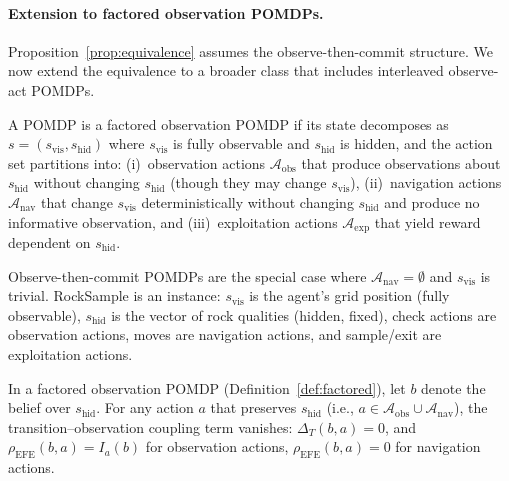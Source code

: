 \documentclass[runningheads]{llncs}
\begin{document}
\paragraph{Extension to factored observation POMDPs.}
\label{par:frontier}
Proposition~\ref{prop:equivalence} assumes the observe-then-commit structure. We now extend the equivalence to a broader class that includes interleaved observe-act POMDPs.

\begin{definition}
\label{def:factored}
A POMDP is a factored observation POMDP if its state decomposes as $s = (s_{\mathrm{vis}}, s_{\mathrm{hid}})$ where $s_{\mathrm{vis}}$ is fully observable and $s_{\mathrm{hid}}$ is hidden, and the action set partitions into: (i)~observation actions $\mathcal{A}_{\mathrm{obs}}$ that produce observations about $s_{\mathrm{hid}}$ without changing $s_{\mathrm{hid}}$ (though they may change $s_{\mathrm{vis}}$), (ii)~navigation actions $\mathcal{A}_{\mathrm{nav}}$ that change $s_{\mathrm{vis}}$ deterministically without changing $s_{\mathrm{hid}}$ and produce no informative observation, and (iii)~exploitation actions $\mathcal{A}_{\mathrm{exp}}$ that yield reward dependent on $s_{\mathrm{hid}}$.
\end{definition}

Observe-then-commit POMDPs are the special case where $\mathcal{A}_{\mathrm{nav}} = \emptyset$ and $s_{\mathrm{vis}}$ is trivial. RockSample \citep{smith2004} is an instance: $s_{\mathrm{vis}}$ is the agent's grid position (fully observable), $s_{\mathrm{hid}}$ is the vector of rock qualities (hidden, fixed), check actions are observation actions, moves are navigation actions, and sample/exit are exploitation actions.

\begin{proposition}
\label{prop:factored}
In a factored observation POMDP (Definition~\ref{def:factored}), let $b$ denote the belief over $s_{\mathrm{hid}}$. For any action $a$ that preserves $s_{\mathrm{hid}}$ (i.e., $a \in \mathcal{A}_{\mathrm{obs}} \cup \mathcal{A}_{\mathrm{nav}}$), the transition--observation coupling term vanishes: $\Delta_T(b, a) = 0$, and $\rho_{\mathrm{EFE}}(b, a) = I_a(b)$ for observation actions, $\rho_{\mathrm{EFE}}(b, a) = 0$ for navigation actions.
\end{proposition}
\end{document}
